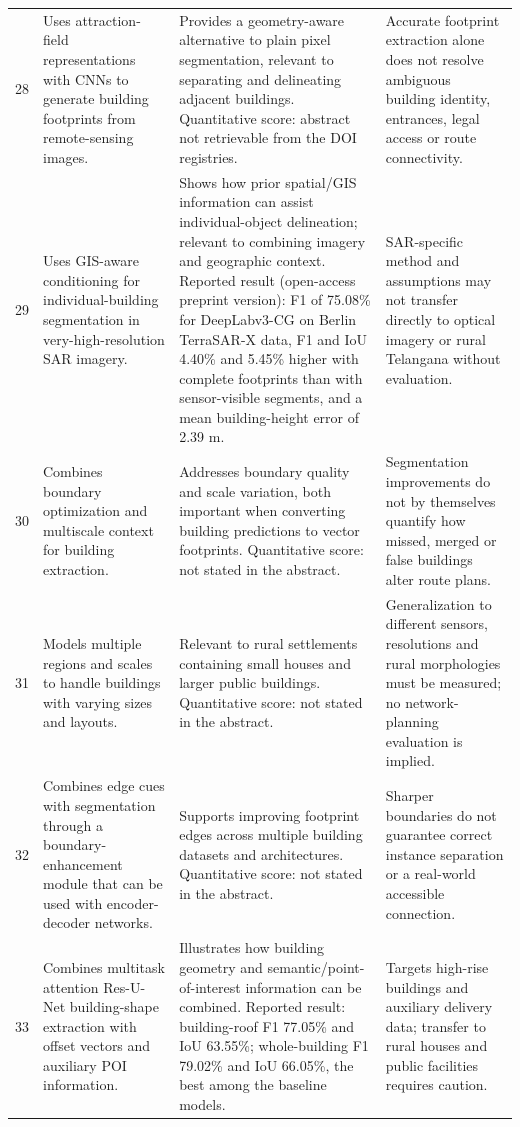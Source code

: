 \begin{landscape}
\begin{longtable}{@{}L{0.6cm}L{7.5cm}L{8.0cm}L{7.5cm}@{}}
28 & Uses attraction-field representations with CNNs to generate building footprints from remote-sensing images. & Provides a geometry-aware alternative to plain pixel segmentation, relevant to separating and delineating adjacent buildings. Quantitative score: abstract not retrievable from the DOI registries. & Accurate footprint extraction alone does not resolve ambiguous building identity, entrances, legal access or route connectivity.  \\
29 & Uses GIS-aware conditioning for individual-building segmentation in very-high-resolution SAR imagery. & Shows how prior spatial/GIS information can assist individual-object delineation; relevant to combining imagery and geographic context. Reported result (open-access preprint version): F1 of 75.08\% for DeepLabv3-CG on Berlin TerraSAR-X data, F1 and IoU 4.40\% and 5.45\% higher with complete footprints than with sensor-visible segments, and a mean building-height error of 2.39 m. & SAR-specific method and assumptions may not transfer directly to optical imagery or rural Telangana without evaluation.  \\
30 & Combines boundary optimization and multiscale context for building extraction. & Addresses boundary quality and scale variation, both important when converting building predictions to vector footprints. Quantitative score: not stated in the abstract. & Segmentation improvements do not by themselves quantify how missed, merged or false buildings alter route plans.  \\
31 & Models multiple regions and scales to handle buildings with varying sizes and layouts. & Relevant to rural settlements containing small houses and larger public buildings. Quantitative score: not stated in the abstract. & Generalization to different sensors, resolutions and rural morphologies must be measured; no network-planning evaluation is implied.  \\
32 & Combines edge cues with segmentation through a boundary-enhancement module that can be used with encoder-decoder networks. & Supports improving footprint edges across multiple building datasets and architectures. Quantitative score: not stated in the abstract. & Sharper boundaries do not guarantee correct instance separation or a real-world accessible connection.  \\
33 & Combines multitask attention Res-U-Net building-shape extraction with offset vectors and auxiliary POI information. & Illustrates how building geometry and semantic/point-of-interest information can be combined. Reported result: building-roof F1 77.05\% and IoU 63.55\%; whole-building F1 79.02\% and IoU 66.05\%, the best among the baseline models. & Targets high-rise buildings and auxiliary delivery data; transfer to rural houses and public facilities requires caution.  \\

\end{longtable}
\end{landscape}
